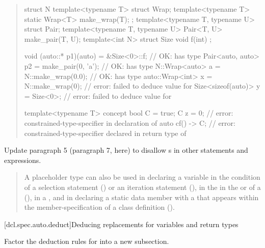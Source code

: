 \begin{quote}
\begin{addedblock}
\begin{codeblock}
struct N {
  template<typename T> struct Wrap;
  template<typename T> static Wrap<T> make_wrap(T);
};
template<typename T, typename U> struct Pair;
template<typename T, typename U> Pair<T, U> make_pair(T, U);
template<int N> struct Size { void f(int) { }  };

void (auto::* p1)(auto) = &Size<0>::f;   // OK:  has type 
Pair<auto, auto> p2 = make_pair(0, 'a'); // OK:  has type 
N::Wrap<auto> a = N::make_wrap(0.0);     // OK:  has type 
auto::Wrap<int> x = N::make_wrap(0);     // error: failed to deduce value for 
Size<sizeof(auto)> y = Size<0>{};        // error: failed to deduce value for 

template<typename T> concept bool C = true;
C z = 0;        // error: constrained-type-specifier in declaration of 
auto cf() -> C; // error: constrained-type-specifier declared in return type of 
\end{codeblock}
\end{addedblock}
\end{quote}


Update paragraph 5 (paragraph 7, here) to disallow 
s in other statements 
and expressions.

\begin{quote}
\pnum
A placeholder type can also be used in declaring a variable in the 
condition of a selection statement () or an iteration 
statement (), in the  in the 
 or  of a 
(), in a , and in declaring a 
static data member with a  that appears
within the member-specification of a class definition ().
% 
\end{quote}


% 
% 
[dcl.spec.auto.deduct]{Deducing replacements for variables and return types}

Factor the deduction rules for  into a new subsection.

